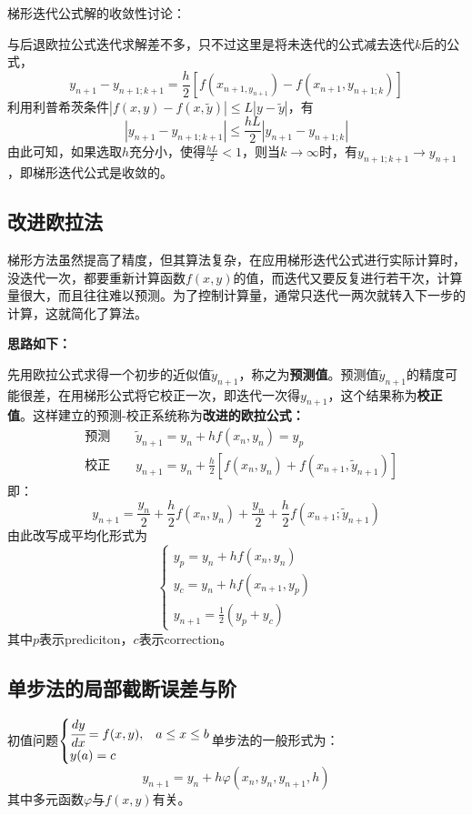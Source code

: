 梯形迭代公式解的收敛性讨论：

与后退欧拉公式迭代求解差不多，只不过这里是将未迭代的公式减去迭代$k$后的公式，
$$y_{n+1}-y_{n+1;k+1}=\frac{h}{2}[f(x_{n+1,y_{n+1}})-f(x_{n+1},y_{n+1;k})]$$
利用利普希茨条件$|f(x,y)-f(x,\tilde{y})|\le L|y-\tilde{y}|$，有
$$|y_{n+1}-y_{n+1;k+1}|\le \frac{hL}{2}|y_{n+1}-y_{n+1;k}|$$
由此可知，如果选取$h$充分小，使得$\frac{hL}{2}<1$，则当$k\rightarrow \infty$时，有$y_{n+1;k+1}\rightarrow y_{n+1}$，即梯形迭代公式是收敛的。



\subsection{改进欧拉法}
梯形方法虽然提高了精度，但其算法复杂，在应用梯形迭代公式进行实际计算时，没迭代一次，都要重新计算函数$f(x,y)$的值，而迭代又要反复进行若干次，计算量很大，而且往往难以预测。为了控制计算量，通常只迭代一两次就转入下一步的计算，这就简化了算法。

\textbf{思路如下：}

先用欧拉公式求得一个初步的近似值$\tilde{y}_{n+1}$，称之为\textbf{预测值}。预测值$\tilde{y}_{n+1}$的精度可能很差，在用梯形公式将它校正一次，即迭代一次得$y_{n+1}$，这个结果称为\textbf{校正值}。这样建立的预测-校正系统称为\textbf{改进的欧拉公式：}
\begin{align*}
&\text{预测}\qquad \tilde{y}_{n+1}=y_n+hf(x_n,y_n)=y_p\\
&\text{校正}\qquad y_{n+1}=y_n+\frac{h}{2}[f(x_n,y_n)+f(x_{n+1},\tilde{y}_{n+1})]
\end{align*}
即：
$$y_{n+1}=\frac{y_n}{2}+\frac{h}{2}f(x_n,y_n)+\frac{y_n}{2}+\frac{h}{2}f(x_{n+1};\tilde{y}_{n+1})$$
由此改写成平均化形式为
$$\begin{cases}
y_p = y_n+hf(x_n,y_n)\\
y_c = y_n+hf(x_{n+1},y_p)\\
y_{n+1}=\frac{1}{2}(y_p+y_c)
\end{cases}$$
其中$p$表示prediciton，$c$表示correction。




\subsection{单步法的局部截断误差与阶}
初值问题$\begin{cases}\cfrac{dy}{dx}=f(x,y),&a\le x\le b\\ y(a)=c &\end{cases}$单步法的一般形式为：
$$y_{n+1}=y_n+h\varphi(x_n,y_n,y_{n+1},h)$$
其中多元函数$\varphi$与$f(x,y)$有关。

